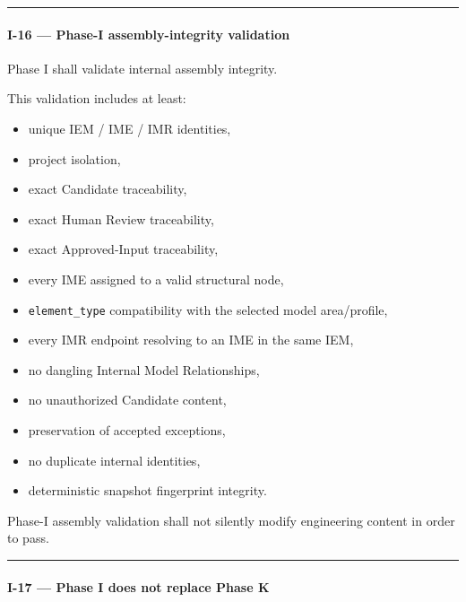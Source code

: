 \begin{center}\rule{0.5\linewidth}{0.5pt}\end{center}

\hypertarget{i-16--phase-i-assembly-integrity-validation}{%
\paragraph{I-16 --- Phase-I assembly-integrity validation}\label{i-16--phase-i-assembly-integrity-validation}}

Phase I shall validate internal assembly integrity.

This validation includes at least:

\begin{itemize}
\tightlist
\item
  unique IEM / IME / IMR identities,
\item
  project isolation,
\item
  exact Candidate traceability,
\item
  exact Human Review traceability,
\item
  exact Approved-Input traceability,
\item
  every IME assigned to a valid structural node,
\item
  \texttt{element\_type} compatibility with the selected model area/profile,
\item
  every IMR endpoint resolving to an IME in the same IEM,
\item
  no dangling Internal Model Relationships,
\item
  no unauthorized Candidate content,
\item
  preservation of accepted exceptions,
\item
  no duplicate internal identities,
\item
  deterministic snapshot fingerprint integrity.
\end{itemize}

Phase-I assembly validation shall not silently modify engineering content in order to pass.

\begin{center}\rule{0.5\linewidth}{0.5pt}\end{center}

\hypertarget{i-17--phase-i-does-not-replace-phase-k}{%
\paragraph{I-17 --- Phase I does not replace Phase K}\label{i-17--phase-i-does-not-replace-phase-k}}

